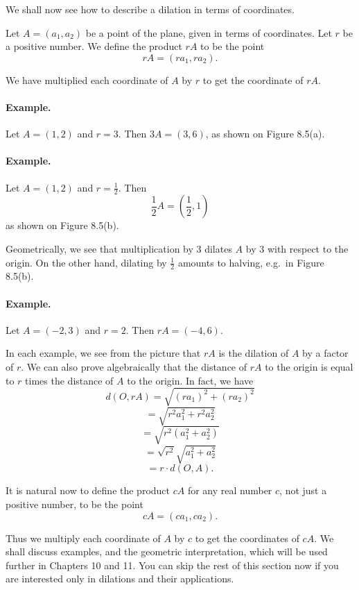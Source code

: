 \documentclass[12pt]{book} %
\begin{document}

We shall now see how to describe a dilation in terms of coordinates.

Let $A=(a_1,a_2)$ be a point of the plane, given in terms of coordinates. Let $r$ be a positive number. We define the product $rA$ to be the point
\[
rA=(ra_1,ra_2).
\]

We have multiplied each coordinate of $A$ by $r$ to get the coordinate of $rA$.

\paragraph{Example.}
Let $A=(1,2)$ and $r=3$. Then $3A=(3,6)$, as shown on Figure 8.5(a).

\paragraph{Example.}
Let $A=(1,2)$ and $r=\frac12$. Then
\[
\frac12A=\left(\frac12,1\right)
\]
as shown on Figure 8.5(b).


Geometrically, we see that multiplication by 3 dilates $A$ by 3 with respect to the origin. On the other hand, dilating by $\frac12$ amounts to halving, e.g.\ in Figure 8.5(b).

\paragraph{Example.}
Let $A=(-2,3)$ and $r=2$. Then $rA=(-4,6)$.


In each example, we see from the picture that $rA$ is the dilation of $A$ by a factor of $r$. We can also prove algebraically that the distance of $rA$ to the origin is equal to $r$ times the distance of $A$ to the origin. In fact, we have
\[
d(O,rA)=\sqrt{(ra_1)^2+(ra_2)^2}
\]
\[
=\sqrt{r^2a_1^2+r^2a_2^2}
\]
\[
=\sqrt{r^2(a_1^2+a_2^2)}
\]
\[
=\sqrt{r^2}\sqrt{a_1^2+a_2^2}
\]
\[
=r\cdot d(O,A).
\]

It is natural now to define the product $cA$ for any real number $c$, not just a positive number, to be the point
\[
cA=(ca_1,ca_2).
\]

Thus we multiply each coordinate of $A$ by $c$ to get the coordinates of $cA$. We shall discuss examples, and the geometric interpretation, which will be used further in Chapters 10 and 11. You can skip the rest of this section now if you are interested only in dilations and their applications.
\end{document}
